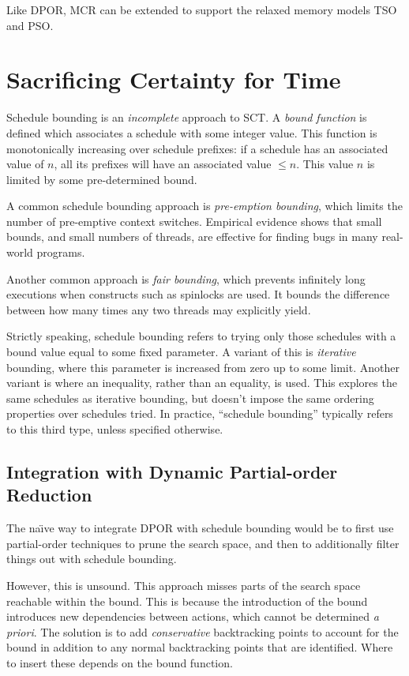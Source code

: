 Like DPOR, MCR can be extended to support the relaxed memory models TSO and
PSO\cite{huang2016}.

\section{Sacrificing Certainty for Time}
\label{sec:sct-incomplete}

Schedule bounding\cite{emmi2011,musuvathi2008,musuvathi2007} is an
\emph{incomplete} approach to SCT\@.  A \emph{bound function} is defined which
associates a schedule with some integer value.  This function is monotonically
increasing over schedule prefixes: if a schedule has an associated value of $n$,
all its prefixes will have an associated value $\leq n$.  This value $n$ is
limited by some pre-determined bound.

A common schedule bounding approach is \emph{pre-emption
  bounding}\cite{musuvathi2007}, which limits the number of pre-emptive context
switches.  Empirical evidence\cite{thomson2014} shows that small bounds, and
small numbers of threads, are effective for finding bugs in many real-world
programs.

Another common approach is \emph{fair bounding}\cite{musuvathi2008}, which
prevents infinitely long executions when constructs such as spinlocks are used.
It bounds the difference between how many times any two threads may explicitly
yield.

Strictly speaking, schedule bounding refers to trying only those schedules with
a bound value equal to some fixed parameter.  A variant of this is
\emph{iterative} bounding, where this parameter is increased from zero up to
some limit.  Another variant is where an inequality, rather than an equality, is
used.  This explores the same schedules as iterative bounding, but doesn't
impose the same ordering properties over schedules tried.  In practice,
``schedule bounding'' typically refers to this third type, unless specified
otherwise.

\subsection{Integration with Dynamic Partial-order Reduction}

The na\"{\i}ve way to integrate DPOR with schedule bounding would be
to first use partial-order techniques to prune the search space, and
then to additionally filter things out with schedule bounding.

However, this is unsound.  This approach misses parts of the search space
reachable within the bound.  This is because the introduction of the bound
introduces new dependencies between actions, which cannot be determined \emph{a
  priori}.  The solution is to add \emph{conservative} backtracking points to
account for the bound in addition to any normal backtracking points that are
identified.  Where to insert these depends on the bound function.

